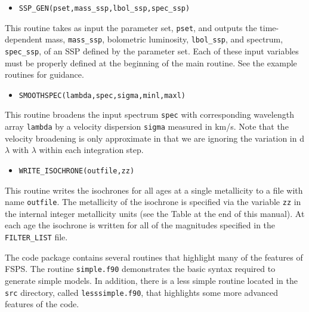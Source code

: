 \documentclass[]{article}
\begin{document}
\begin{itemize}
\item \texttt{SSP\_GEN(pset,mass\_ssp,lbol\_ssp,spec\_ssp)}
\end{itemize}

This routine takes as input the parameter set, \texttt{pset}, and outputs the
time-dependent mass, \texttt{mass\_ssp}, bolometric luminosity,
\texttt{lbol\_ssp}, and spectrum, \texttt{spec\_ssp}, of an SSP defined by the
parameter set.  Each of these input variables must be properly defined at the
beginning of the main routine.  See the example routines for guidance.


\begin{itemize}
\item \texttt{SMOOTHSPEC(lambda,spec,sigma,minl,maxl)}
\end{itemize}

This routine broadens the input spectrum \texttt{spec} with corresponding
wavelength array \texttt{lambda} by a velocity dispersion \texttt{sigma}
measured in km/s.  Note that the velocity broadening is only approximate in that
we are ignoring the variation in d$\lambda$ with $\lambda$ within each
integration step.

\begin{itemize}
\item \texttt{WRITE\_ISOCHRONE(outfile,zz)}
\end{itemize}

This routine writes the isochrones for all ages at a single metallicity to a
file with name \texttt{outfile}.  The metallicity of the isochrone is specified
via the variable \texttt{zz} in the internal integer metallicity units (see the
Table at the end of this manual).  At each age the isochrone is written for all
of the magnitudes specified in the \texttt{FILTER\_LIST} file.

\vspace{0.1in}
\vspace{0.1in}

The code package contains several routines that highlight many of the features
of FSPS.  The routine \texttt{simple.f90} demonstrates the basic syntax required
to generate simple models.  In addition, there is a less simple routine located
in the \texttt{src} directory, called \texttt{lesssimple.f90}, that highlights
some more advanced features of the code.


\vspace{0.1in}
\vspace{0.1in}
\end{document}
